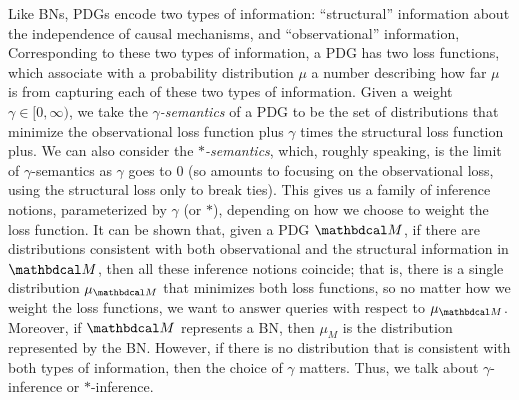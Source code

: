 \documentclass[twoside]{article}
\newcommand\discard[1]{}
\begin{document}
{Like BNs, PDGs encode two types of information: ``structural''
information about the independence of causal mechanisms,
and ``observational'' information,
Corresponding to these two types of information,
a PDG has two loss functions,
which associate with a
probability distribution $\mu$
a number describing
how far $\mu$ is from capturing each of
these two types of information.
{
    Given a weight $\gamma \in [0,\infty)$,
    we take the \emph{$\gamma$-semantics} of a PDG to be the
    set of distributions that minimize the observational loss function
    plus $\gamma$ times the structural loss function plus.
    We can also consider the \emph{$*$-semantics}, which, roughly speaking,
    is the limit of $ \gamma$-semantics as $\gamma$ goes to 0 (so amounts to focusing on
    the observational loss, using the structural loss only to break
    ties).  This gives us a family of inference notions, parameterized
    by $\gamma$ (or $*$), depending on how we choose to weight the loss
    function. 
}
It can be shown that, given a PDG $\dg M$, if there are distributions
consistent with
both observational and the structural information in
${\dg M}$, then all these inference notions coincide; that is, 
{
    there is a
    single distribution $\mu_{\dg M}$ that minimizes both loss functions, so
    no matter how we weight the loss functions, we want to answer
    queries with respect  to $\mu_{\dg M}$.
}
Moreover, if $\dg M$ represents a BN,
then $\mu_M$ is the distribution represented by the BN.  
However, if there is no
distribution that is consistent with both types of information, then
the choice of $\gamma$ matters.  
Thus, we talk about $\gamma$-inference or $*$-inference.
}
\end{document}
